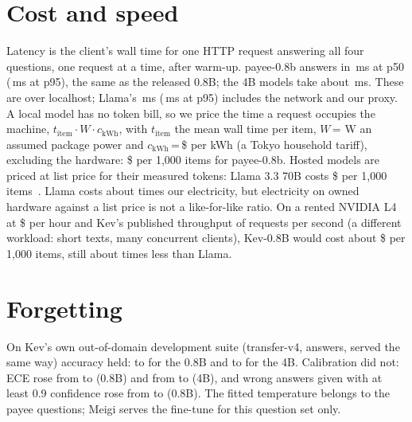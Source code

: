 \documentclass[conference]{IEEEtran}
\begin{document}
\section{Cost and speed}\label{sec:cost}
Latency is the client's wall time for one HTTP request answering all four questions, one request at a time, after
warm-up. payee-0.8b answers in \NOursPfifty{}\,ms at p50 (\NOursPninetyfive{}\,ms at p95), the same as the released
0.8B; the 4B models take about \NOursFourPfifty{}\,ms. These are over localhost; Llama's \NLlamaPfifty{}\,ms
(\NLlamaPninetyfive{}\,ms at p95) includes the network and our proxy. A local model has no token bill, so we price the
time a request occupies the machine, $t_\text{item}\cdot W\cdot c_\mathrm{kWh}$, with $t_\text{item}$ the mean wall
time per item, $W$\,=\,\NWatts{}\,W an assumed package power and $c_\mathrm{kWh}$\,=\,\$\NUsdKwh{} per kWh (a Tokyo
household tariff), excluding the hardware: \$\NOursCost{} per 1,000 items for payee-0.8b. Hosted models are priced
at list price for their measured tokens: Llama 3.3 70B costs \$\NLlamaCost{} per 1,000 items~\cite{cloudflare_pricing}.
\NFrontierCost{} Llama costs about \NLlamaOverOurs{} times our electricity, but electricity on owned hardware against a
list price is not a like-for-like ratio. On a rented NVIDIA L4
at \$\NLfourHour{} per hour and Kev's published throughput of \NLfourRps{} requests per second (a different workload:
short texts, many concurrent clients), Kev-0.8B would cost about \$\NLfourCost{} per 1,000 items, still about
\NLlamaOverLfour{} times less than Llama.


\section{Forgetting}
On Kev's own out-of-domain development suite
(transfer-v4, \NFgN{} answers, served the same way) accuracy held: \NFgBaseAcc{} to \NFgOursAcc{} for the 0.8B and
\NFgBaseFourAcc{} to \NFgOursFourAcc{} for the 4B. Calibration did not: ECE rose from \NFgBaseEce{} to \NFgOursEce{}
(0.8B) and from \NFgBaseFourEce{} to \NFgOursFourEce{} (4B), and wrong answers given with at least 0.9 confidence rose
from \NFgBaseConf{} to \NFgOursConf{} (0.8B). The fitted temperature belongs to the payee questions; Meigi serves the
fine-tune for this question set only.
\end{document}
